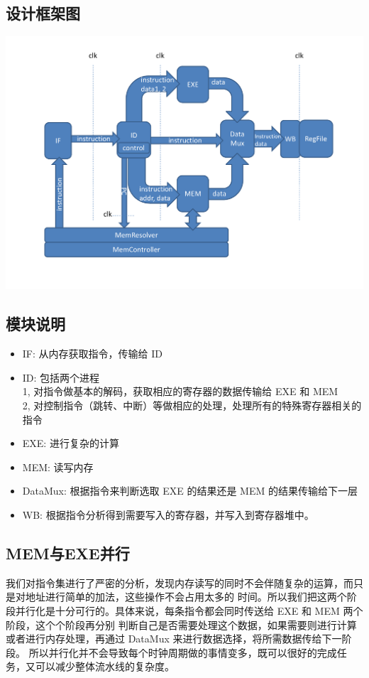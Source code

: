 \documentclass[10pt]{article}
\begin{document}
\begin{CJK}{UTF8}{gbsn}
\subsection{设计框架图}
\includegraphics[width=1.0\linewidth]{framework.pdf}

\subsection{模块说明}
\begin{itemize}
\item IF: 从内存获取指令，传输给 ID
\item ID: 包括两个进程\\
1, 对指令做基本的解码，获取相应的寄存器的数据传输给 EXE 和 MEM \\
2, 对控制指令（跳转、中断）等做相应的处理，处理所有的特殊寄存器相关的指令
\item EXE: 进行复杂的计算
\item MEM: 读写内存
\item DataMux: 根据指令来判断选取 EXE 的结果还是 MEM 的结果传输给下一层
\item WB: 根据指令分析得到需要写入的寄存器，并写入到寄存器堆中。
\end{itemize}

\subsection{MEM与EXE并行}
我们对指令集进行了严密的分析，发现内存读写的同时不会伴随复杂的运算，而只是对地址进行简单的加法，这些操作不会占用太多的
时间。所以我们把这两个阶段并行化是十分可行的。具体来说，每条指令都会同时传送给 EXE 和 MEM 两个阶段，这个个阶段再分别
判断自己是否需要处理这个数据，如果需要则进行计算或者进行内存处理，再通过 DataMux 来进行数据选择，将所需数据传给下一阶段。
所以并行化并不会导致每个时钟周期做的事情变多，既可以很好的完成任务，又可以减少整体流水线的复杂度。


\end{CJK}
\end{document}
